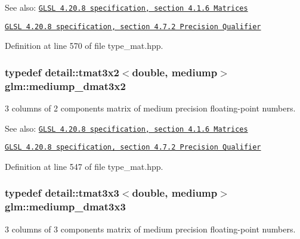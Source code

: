 \begin{Desc}
\item[See also:]\href{http://www.opengl.org/registry/doc/GLSLangSpec.4.20.8.pdf}{\tt GLSL 4.20.8 specification, section 4.1.6 Matrices} 

\href{http://www.opengl.org/registry/doc/GLSLangSpec.4.20.8.pdf}{\tt GLSL 4.20.8 specification, section 4.7.2 Precision Qualifier} \end{Desc}


Definition at line 570 of file type\_\-mat.hpp.\hypertarget{group__core__precision_gff0060984716bcda68ff69ed27536bf6}{
\subsubsection[mediump\_\-dmat3x2]{\setlength{\rightskip}{0pt plus 5cm}typedef detail::tmat3x2$<$double, mediump$>$ {\bf glm::mediump\_\-dmat3x2}}}
\label{group__core__precision_gff0060984716bcda68ff69ed27536bf6}


3 columns of 2 components matrix of medium precision floating-point numbers.

\begin{Desc}
\item[See also:]\href{http://www.opengl.org/registry/doc/GLSLangSpec.4.20.8.pdf}{\tt GLSL 4.20.8 specification, section 4.1.6 Matrices} 

\href{http://www.opengl.org/registry/doc/GLSLangSpec.4.20.8.pdf}{\tt GLSL 4.20.8 specification, section 4.7.2 Precision Qualifier} \end{Desc}


Definition at line 547 of file type\_\-mat.hpp.\hypertarget{group__core__precision_g2f73508d8192390ca9f9b569f544fade}{
\subsubsection[mediump\_\-dmat3x3]{\setlength{\rightskip}{0pt plus 5cm}typedef detail::tmat3x3$<$double, mediump$>$ {\bf glm::mediump\_\-dmat3x3}}}
\label{group__core__precision_g2f73508d8192390ca9f9b569f544fade}


3 columns of 3 components matrix of medium precision floating-point numbers.


